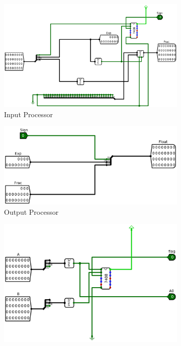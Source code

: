 \documentclass[12pt]{article}
\begin{document}
\begin{figure}[H]
    \centering
    \begin{subfigure}[b]{0.45\textwidth}
        \includegraphics[width=\textwidth]{Images/InputProcess.png}
        \caption{Input Processor}
        \label{fig:inpprocess}
    \end{subfigure}
    \begin{subfigure}[b]{0.45\textwidth}
        \includegraphics[width=\textwidth]{Images/OutputProcess.png}
        \caption{Output Processor}
        \label{fig:outprocess}
    \end{subfigure}
    \newline
    \newline
    \begin{subfigure}[b]{0.45\textwidth}
        \includegraphics[width=\textwidth]{Images/InputChecker.png}

\end{subfigure}
\end{figure}
\end{document}
